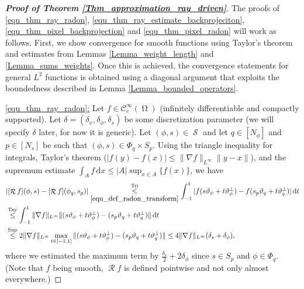 \documentclass[11pt,reqno]{amsart}
\DeclareMathOperator{\NN}{\mathbb{N}}
\DeclareMathOperator{\Radon}{\mathcal{R}}
\DeclareMathOperator{\RayRadon}{\mathcal{R}^\mathrm{rd}_{\delta}}
\DeclareMathOperator{\imgdom}{\Omega}
\DeclareMathOperator{\sinodom}{\mathcal{S}}
\newcommand{\dd}[1]{\,\mathrm{d}{#1}}
\numberwithin{theorem}{section}
\theoremstyle{remark}
\begin{document}
\begin{proof}[\textbf{Proof of Theorem \ref{Thm_approximation_ray_driven}}]
	The proofs of \eqref{equ_thm_ray_radon}, \eqref{equ_thm_ray_estimate_backprojeciton}, \eqref{equ_thm_pixel_backprojection} and \eqref{equ_thm_pixel_radon} will work as follows. First, we show convergence for smooth functions using Taylor's theorem and estimates from Lemmas \ref{Lemma_weight_length} and \ref{Lemma_sums_weights}. Once this is achieved, the convergence statements for general $L^2$ functions is obtained using a diagonal argument that exploits the boundedness described in Lemma \ref{Lemma_bounded_operators}.

    \underline{\eqref{equ_thm_ray_radon}:} Let $f\in \mathcal{C}^\infty_c(\imgdom)$ (infinitely differentiable and compactly supported). 
Let $\delta = (\delta_x,\delta_\phi,\delta_s)$ be some discretization parameter (we will specify $\delta$ later, for now it is generic).
    Let $(\phi,s)\in \sinodom$ and let $q\in [N_\phi]$ and $p\in [N_s]$ be such that $(\phi,s)\in \Phi_q\times S_p$. Using the triangle inequality for integrals, Taylor's theorem ($|f(y)-f(x)| \leq \| \nabla f\|_{L^\infty} \|y-x\|$), and the supremum estimate $\int_A f \dd x \leq |A| \sup_{x\in A}\{f(x)\}$, we have
    \begin{align} 
\label{equ_proof_ray_driven_local_est1}
        &|[\Radon f](\phi,s)-[\Radon f](\phi_q,s_p)| \underset{\eqref{equ_def_radon_transform}}{\overset{\text{Tri}}{\leq}} \int_{-1}^1 |f(s\vartheta_\phi+t \vartheta_\phi^\perp) - f(s_p\vartheta_q+t \vartheta_q^\perp)| \dd t\notag
        \\
        &\overset{\text{Tay}}{\leq}  \int_{-1}^1 \|\nabla f\|_{L^\infty}  \|(s\vartheta_\phi+t \vartheta_\phi^\perp) - (s_p\vartheta_q+t \vartheta_q^\perp)  \| \dd t
        \\
        &\overset{\text{Sup}}{\leq} 2\|\nabla f\|_{L^\infty} \max_{t\in [-1,1]}\|(s\vartheta_\phi+t \vartheta_\phi^\perp) - (s_p\vartheta_q+t \vartheta_q^\perp)  \| \leq  4 \|\nabla f\|_{L^\infty}(\delta_s+\delta_\phi),\notag
        \end{align}
where we estimated the maximum term by $ \frac{\delta_s}{2}+ 2 \delta_\phi$ since $s\in S_p$ and $\phi \in \Phi_q$.   (Note that $f$ being smooth, $\Radon f$ is defined pointwise and not only almost everywhere.)
    

\end{proof}
\end{document}
